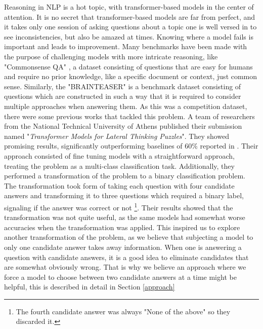 Reasoning in NLP is a hot topic, with transformer-based models in the center of attention.
It is no secret that transformer-based models are far from perfect, and it takes only one session of asking questions about a topic one is well versed in to see inconsistencies, but also be amazed at times.
Knowing where a model fails is important and leads to improvement.  Many benchmarks have been made with the purpose of challenging models with more intricate reasoning, like "Commonsense QA" \citep{commonsenseQA}, a dataset consisting of questions that are easy for humans and require no prior knowledge, like a specific document or context, just common sense.
Similarly, the "BRAINTEASER" \citep{semeval} is a benchmark dataset consisting of questions which are constructed in such a way that it is required to consider multiple approaches when answering them.
As this was a competition dataset, there were some previous works that tackled this problem.
A team of researchers from the National Technical University of Athens published their submission \citep{ails-lab} named "\textit{Transformer Models for Lateral Thinking Puzzles}".
They showed promising results, significantly outperforming baselines of 60\% reported in \citep{semeval}.
Their approach consisted of fine tuning models with a straightforward approach, treating the problem as a multi-class classification task. Additionally, they performed a transformation of the problem to a binary classification problem. 
The transformation took form of taking each question with four candidate answers and transforming it to three questions which required a binary label, signaling if the answer was correct or not \footnote[1]{The fourth candidate answer was always "None of the above" so they discarded it.}.
Their results showed that the transformation was not quite useful, as the same models had somewhat worse accuracies when the transformation was applied.  
This inspired us to explore another transformation of the problem, as we believe that subjecting a model to only one candidate answer takes away information.
When one is answering a question with candidate answers, it is a good idea to eliminate candidates that are somewhat obviously wrong.
That is why we believe an approach where we force a model to choose between two candidate answers at a time might be helpful, this is described in detail in Section \ref{approach}